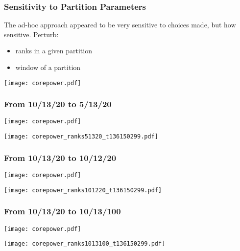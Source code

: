 \documentclass[fleqn]{beamer}
\begin{document}
\begin{frame}
\frametitle{Sensitivity to Partition Parameters}

The ad-hoc approach appeared to be very sensitive to choices made, but how sensitive.  Perturb:
\begin{itemize}
 \item ranks in a given partition
 \item window of a partition
\end{itemize}
\vfill
\texttt{[image: corepower.pdf]}

\end{frame}


\begin{frame}
\frametitle{From 10/13/20 to 5/13/20}

\texttt{[image: corepower.pdf]}

\texttt{[image: corepower\_ranks51320\_t136150299.pdf]}

\end{frame}



\begin{frame}
\frametitle{From 10/13/20 to 10/12/20}
 
\texttt{[image: corepower.pdf]}

\texttt{[image: corepower\_ranks101220\_t136150299.pdf]}
 
\end{frame}


\begin{frame}
\frametitle{From 10/13/20 to 10/13/100}

\texttt{[image: corepower.pdf]}

\texttt{[image: corepower\_ranks1013100\_t136150299.pdf]}

\end{frame}
\end{document}
